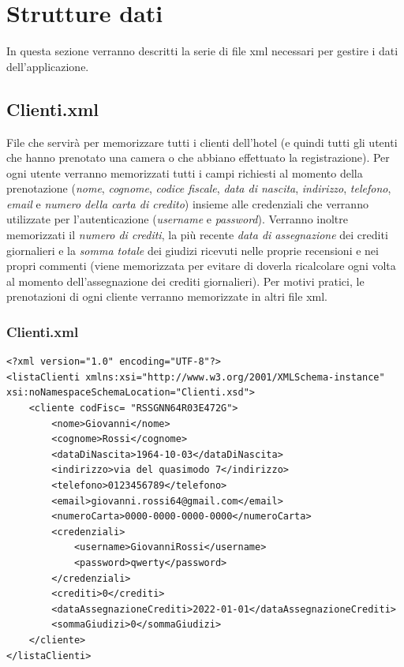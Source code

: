\documentclass [a4paper, 12pt]{book}
\begin{document}
\medskip
\medskip

\section{Strutture dati}
In questa sezione verranno descritti la serie di file xml necessari per gestire i dati dell'applicazione.

\subsection{Clienti.xml}
File che servirà per memorizzare tutti i clienti dell'hotel (e quindi tutti gli utenti che hanno prenotato una camera o che abbiano effettuato la registrazione). Per ogni utente verranno memorizzati tutti i campi richiesti al momento della prenotazione (\textit{nome}, \textit{cognome}, \textit{codice fiscale}, \textit{data di nascita}, \textit{indirizzo}, \textit{telefono}, \textit{email} e \textit{numero della carta di credito}) insieme alle credenziali che verranno utilizzate per l'autenticazione (\textit{username} e \textit{password}). Verranno inoltre memorizzati il \textit{numero di crediti}, la più recente \textit{data di assegnazione} dei crediti giornalieri e la \textit{somma totale} dei giudizi ricevuti nelle proprie recensioni e nei propri commenti (viene memorizzata per evitare di doverla ricalcolare ogni volta al momento dell'assegnazione dei crediti giornalieri). Per motivi pratici, le prenotazioni di ogni cliente verranno memorizzate in altri file xml.
\subsubsection{Clienti.xml}
\begin{lstlisting}[style=XML]
<?xml version="1.0" encoding="UTF-8"?>
<listaClienti xmlns:xsi="http://www.w3.org/2001/XMLSchema-instance" xsi:noNamespaceSchemaLocation="Clienti.xsd">
    <cliente codFisc= "RSSGNN64R03E472G">
        <nome>Giovanni</nome>
        <cognome>Rossi</cognome>
        <dataDiNascita>1964-10-03</dataDiNascita>
        <indirizzo>via del quasimodo 7</indirizzo>
        <telefono>0123456789</telefono>
        <email>giovanni.rossi64@gmail.com</email>
        <numeroCarta>0000-0000-0000-0000</numeroCarta>
        <credenziali>
            <username>GiovanniRossi</username>
            <password>qwerty</password>
        </credenziali>
        <crediti>0</crediti>
        <dataAssegnazioneCrediti>2022-01-01</dataAssegnazioneCrediti>
        <sommaGiudizi>0</sommaGiudizi>
    </cliente>
</listaClienti>


\end{lstlisting}
\end{document}
